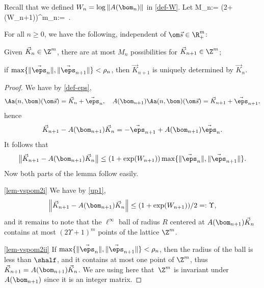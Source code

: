Recall that we defined $W_n = \log\|A(\bom_n)\|$ in \eqref{def-W}.
Let
\be \label{def-Mn}
M_n:= \bigl(2+\exp(W_{n+1})\bigr)^m\quad {}\quad \rho_n:= \,.
\ee

\begin{lemma} \label{lem-vspom2}
For all $n\ge 0$, we have the following, independent of $\om\vec s\in \R_+^m$:
\begin{enumeratei}
\item\label{lem-vspom2i}
Given $\vec{K}_{n}\in\Z^m$, there are at most $M_n$ possibilities for $\vec K_{n+1}\in\Z^m$;

\item\label{lem-vspom2ii}
if $\max\{\|\vec\eps_{n}\|,\|\vec\eps_{{n+1}}\| \}< \rho_n$, then $\vec K_{{n+1}}$ is uniquely determined by $\vec K_{n}$.
\end{enumeratei}
\end{lemma}

\begin{proof}
We have by \eqref{def-eps},
\[
\Aa(n,\bom) (\om\vec s) = \vec{K}_n + \vec{\eps}_n,\quad A(\bom_{n+1}) \Aa(n,\bom) (\om\vec s) = \vec{K}_{n+1} + \vec{\eps}_{n+1},
\]
hence
\[
\vec{K}_{n+1} - A(\bom_{n+1})\vec{K}_n = -\vec{\eps}_{n+1} + A(\bom_{n+1})\vec{\eps}_n.
\]
It follows that
\[
\bigl\|\vec{K}_{n+1} - A(\bom_{n+1})\vec{K}_n\bigr\| \le (1 + \exp (W_{n+1}))\max\{\|\vec\eps_{n}\|,\|\vec\eps_{{n+1}}\|\}.
\]
Now both parts of the lemma follow easily.

\eqref{lem-vspom2i} We have by \eqref{up1},
\[
\left\|\vec{K}_{n+1} - A(\bom_{n+1})\vec{K}_n\right\| \le (1 + \exp (W_{n+1}))/2=:\Upsilon,
\]
and it remains to note that the $\ell^\infty$ ball of radius $R$ centered at $A(\bom_{n+1})\vec{K}_n$ contains at most $(2\Upsilon+1)^m$ points of the lattice $\Z^m$.

\eqref{lem-vspom2ii} If $\max\{\|\vec\eps_{n}\|,\|\vec\eps_{{n+1}}\|\}< \rho_n$, then the radius of the ball is less than $\shalf$, and it contains at most one point of $\Z^m$, thus $\vec{K}_{n+1} = A(\bom_{n+1})\vec{K}_n$. We are using here that~$\Z^m$ is invariant under $A(\bom_{n+1})$ since it is an integer matrix.
\end{proof}

